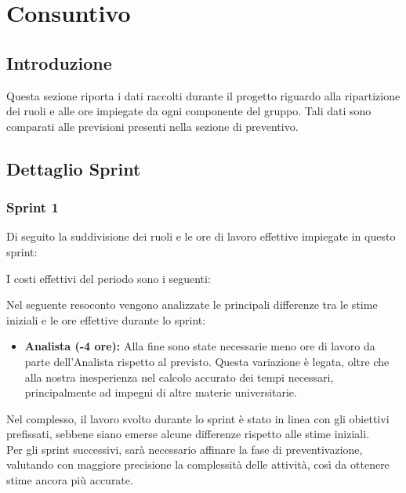 \section{Consuntivo}
\subsection{Introduzione}
Questa sezione riporta i dati raccolti durante il progetto riguardo alla ripartizione dei ruoli e alle ore impiegate da ogni componente del gruppo. Tali dati sono comparati alle previsioni presenti nella sezione di preventivo.

\subsection{Dettaglio Sprint}

\subsubsection{Sprint 1}
Di seguito la suddivisione dei ruoli e le ore di lavoro effettive impiegate in questo sprint:




I costi effettivi del periodo sono i seguenti:




Nel seguente resoconto vengono analizzate le principali differenze tra le stime iniziali e le ore effettive durante lo sprint:
\begin{itemize}
    \item \textbf{Analista (-4 ore):} Alla fine sono state necessarie meno ore di lavoro da parte 
    dell'Analista rispetto al previsto. Questa variazione è legata, oltre che alla nostra inesperienza nel calcolo 
    accurato dei tempi necessari, principalmente ad impegni di altre materie universitarie.

\end{itemize}
Nel complesso, il lavoro svolto durante lo sprint è stato in linea con gli obiettivi prefissati, sebbene siano emerse alcune differenze rispetto alle stime iniziali.\\
Per gli sprint successivi, sarà necessario affinare la fase di preventivazione, valutando con 
maggiore precisione la complessità delle attività, così da ottenere stime ancora più accurate.\\



